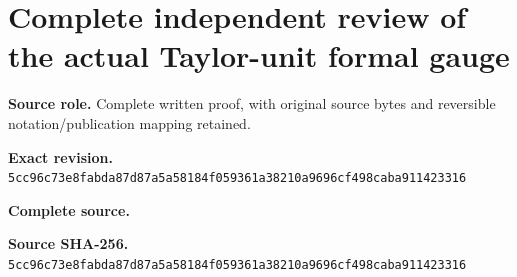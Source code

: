 \begingroup
\sloppy
\small
\section{Complete independent review of the actual Taylor-unit formal gauge}
\noindent\textbf{Source role.} Complete written proof, with original source bytes and reversible notation/publication mapping retained.\par
\noindent\textbf{Exact revision.} \nolinkurl{5cc96c73e8fabda87d87a5a58184f059361a38210a9696cf498caba911423316}\par
\noindent\textbf{Complete source.} \par
\noindent\textbf{Source SHA-256.} \nolinkurl{5cc96c73e8fabda87d87a5a58184f059361a38210a9696cf498caba911423316}\par\medskip

\endgroup
